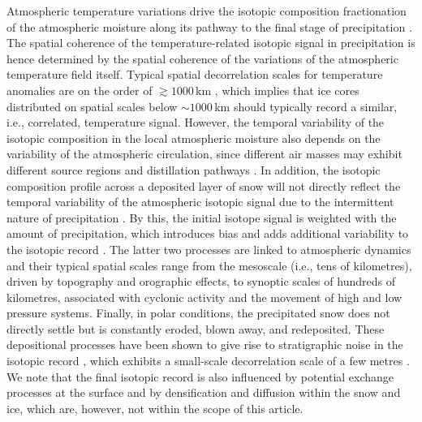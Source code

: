 \documentclass[cp, manuscript]{copernicus}
\begin{document}
Atmospheric temperature variations drive the isotopic composition fractionation
of the atmospheric moisture along its pathway to the final stage of
precipitation \citep{Dansgaard1964,Jouzel1984}. The spatial coherence of the
temperature-related isotopic signal in precipitation is hence determined by the
spatial coherence of the variations of the atmospheric temperature field
itself. Typical spatial decorrelation scales for temperature anomalies are on
the order of $\gtrsim1000$\,km \citep{Jones1997}, which implies that ice cores
distributed on spatial scales below $\sim 1000$\,km should typically record a
similar, i.e., correlated, temperature signal. However, the temporal variability
of the isotopic composition in the local atmospheric moisture also depends on
the variability of the atmospheric circulation, since different air masses may
exhibit different source regions and distillation pathways \citep{Schlosser2004,
Sodemann2008a,Birks2009,Kuttel2012}. In addition, the isotopic composition
profile across a deposited layer of snow will not directly reflect the temporal
variability of the atmospheric isotopic signal due to the intermittent nature of
precipitation \citep{Schleiss2015}. By this, the initial isotope signal is
weighted with the amount of precipitation, which introduces bias
\citep{Steig1994,Laepple2011a} and adds additional variability to the isotopic
record \citep{Persson2011,Casado2020}. The latter two processes are linked to
atmospheric dynamics and their typical spatial scales range from the mesoscale
(i.e., tens of kilometres), driven by topography and orographic effects, to
synoptic scales of hundreds of kilometres, associated with cyclonic activity and
the movement of high and low pressure systems. Finally, in polar conditions, the
precipitated snow does not directly settle but is constantly eroded, blown away,
and redeposited. These depositional processes have been shown to give rise to
stratigraphic noise in the isotopic record
\citep{Fisher1985,Munch2016,Laepple2016}, which exhibits a small-scale
decorrelation scale of a few metres \citep{Munch2016}. We note that the final
isotopic record is also influenced by potential exchange processes at the
surface and by densification and diffusion within the snow and ice, which are,
however, not within the scope of this article.
\end{document}

